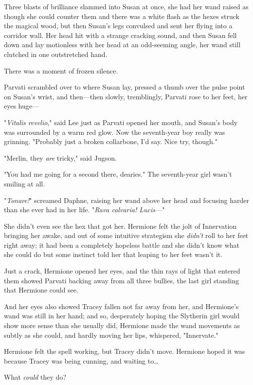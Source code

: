 Three blasts of brilliance slammed into Susan at once, she had her wand raised 
as though she could counter them and there was a white flash as the hexes 
struck the magical wood, but then Susan's legs convulsed and sent her flying 
into a corridor wall. Her head hit with a strange cracking sound, and then 
Susan fell down and lay motionless with her head at an odd-seeming angle, her 
wand still clutched in one outstretched hand.

There was a moment of frozen silence.

Parvati scrambled over to where Susan lay, pressed a thumb over the pulse point 
on Susan's wrist, and then---then slowly, tremblingly, Parvati rose to her 
feet, her eyes huge---

"\emph{Vitalis revelio}," said Lee just as Parvati opened her mouth, and 
Susan's body was surrounded by a warm red glow. Now the seventh-year boy really 
was grinning. "Probably just a broken collarbone, I'd say. Nice try, though."

"Merlin, they \emph{are} tricky," said Jugson.

"You had me going for a second there, dearies." The seventh-year girl wasn't 
smiling at all.

"\emph{Tonare!}" screamed Daphne, raising her wand above her head and focusing 
harder than she ever had in her life. "\emph{Rava calvaria! Lucis---}"

She didn't even see the hex that got her.
\sbreak
Hermione felt the jolt of Innervation bringing her awake, and out of some 
intuitive strategism she \emph{didn't} roll to her feet right away; it had been 
a completely hopeless battle and she didn't know what she could do but some 
instinct told her that leaping to her feet wasn't it.

Just a crack, Hermione opened her eyes, and the thin rays of light that entered 
them showed Parvati backing away from all three bullies, the last girl standing 
that Hermione could see.

And her eyes also showed Tracey fallen not far away from her, and Hermione's 
wand was still in her hand; and so, desperately hoping the Slytherin girl would 
show more sense than she usually did, Hermione made the wand movements as 
subtly as she could, and hardly moving her lips, whispered, "Innervate."

Hermione felt the spell working, but Tracey didn't move. Hermione hoped it was 
because Tracey was being cunning, and waiting to{\ldots}

What \emph{could} they do?

